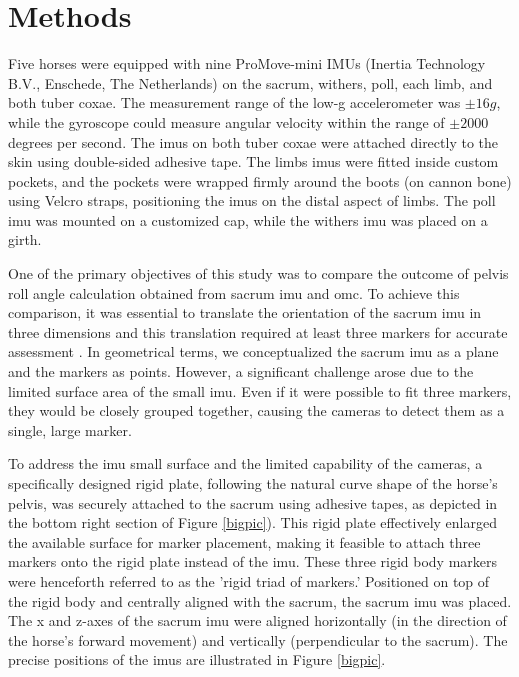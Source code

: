 \section{Methods}
\label{sec:methods}

Five horses were equipped with nine ProMove-mini IMUs (Inertia Technology B.V., Enschede, The Netherlands) on the sacrum, withers, poll, each limb, and both tuber coxae. The measurement range of the low-g accelerometer was $\pm16 g$, while the gyroscope could measure angular velocity within the range of $\pm2000$ degrees per second. The \gls{imu}s on both tuber coxae were attached directly to the skin using double-sided adhesive tape. The limbs \gls{imu}s were fitted inside custom pockets, and the pockets were wrapped firmly around the boots (on cannon bone) using Velcro straps, positioning the \gls{imu}s on the distal aspect of limbs. The poll \gls{imu} was mounted on a customized cap, while the withers \gls{imu} was placed on a girth. 

One of the primary objectives of this study was to compare the outcome of pelvis roll angle calculation obtained from sacrum \gls{imu} and \gls{omc}. To achieve this comparison, it was essential to translate the orientation of the sacrum \gls{imu} in three dimensions and this translation required at least three markers for accurate assessment \cite{Strang2016Calculus3}. In geometrical terms, we conceptualized the sacrum \gls{imu} as a plane and the markers as points. However, a significant challenge arose due to the limited surface area of the small \gls{imu}. Even if it were possible to fit three markers, they would be closely grouped together, causing the cameras to detect them as a single, large marker. 

To address the \gls{imu} small surface and the limited capability of the cameras, a specifically designed rigid plate, following the natural curve shape of the horse's pelvis, was securely attached to the sacrum using adhesive tapes, as depicted in the bottom right section of Figure \ref{bigpic}). This rigid plate effectively enlarged the available surface for marker placement, making it feasible to attach three markers onto the rigid plate instead of the \gls{imu}. These three rigid body markers were henceforth referred to as the 'rigid triad of markers.' Positioned on top of the rigid body and centrally aligned with the sacrum, the sacrum \gls{imu} was placed. The x and z-axes of the sacrum \gls{imu} were aligned horizontally (in the direction of the horse's forward movement) and vertically (perpendicular to the sacrum). The precise positions of the \gls{imu}s are illustrated in Figure \ref{bigpic}.

